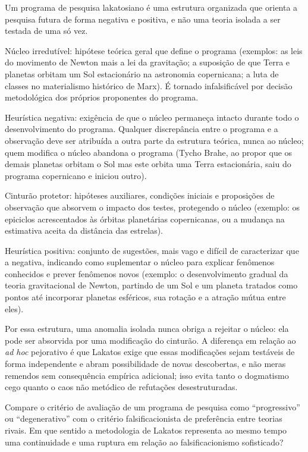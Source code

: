 \documentclass[10pt]{extarticle}
\newcommand{\resposta}[1]{\par\smallskip\noindent #1}
\begin{document}
\begin{questoes}
\resposta{
\begin{topicos}
\item Um programa de pesquisa lakatosiano é uma estrutura organizada que orienta a pesquisa futura de forma negativa e positiva, e não uma teoria isolada a ser testada de uma só vez.
\item Núcleo irredutível: hipótese teórica geral que define o programa (exemplos: as leis do movimento de Newton mais a lei da gravitação; a suposição de que Terra e planetas orbitam um Sol estacionário na astronomia copernicana; a luta de classes no materialismo histórico de Marx). É tornado infalsificável por decisão metodológica dos próprios proponentes do programa.
\item Heurística negativa: exigência de que o núcleo permaneça intacto durante todo o desenvolvimento do programa. Qualquer discrepância entre o programa e a observação deve ser atribuída a outra parte da estrutura teórica, nunca ao núcleo; quem modifica o núcleo abandona o programa (Tycho Brahe, ao propor que os demais planetas orbitam o Sol mas este orbita uma Terra estacionária, saiu do programa copernicano e iniciou outro).
\item Cinturão protetor: hipóteses auxiliares, condições iniciais e proposições de observação que absorvem o impacto dos testes, protegendo o núcleo (exemplo: os epiciclos acrescentados às órbitas planetárias copernicanas, ou a mudança na estimativa aceita da distância das estrelas).
\item Heurística positiva: conjunto de sugestões, mais vago e difícil de caracterizar que a negativa, indicando como suplementar o núcleo para explicar fenômenos conhecidos e prever fenômenos novos (exemplo: o desenvolvimento gradual da teoria gravitacional de Newton, partindo de um Sol e um planeta tratados como pontos até incorporar planetas esféricos, sua rotação e a atração mútua entre eles).
\item Por essa estrutura, uma anomalia isolada nunca obriga a rejeitar o núcleo: ela pode ser absorvida por uma modificação do cinturão. A diferença em relação ao \emph{ad hoc} pejorativo é que Lakatos exige que essas modificações sejam testáveis de forma independente e abram possibilidade de novas descobertas, e não meras remendos sem consequência empírica adicional; isso evita tanto o dogmatismo cego quanto o caos não metódico de refutações desestruturadas.
\end{topicos}
}

\item Compare o critério de avaliação de um programa de pesquisa como \enquote{progressivo} ou \enquote{degenerativo} com o critério falsificacionista de preferência entre teorias rivais. Em que sentido a metodologia de Lakatos representa ao mesmo tempo uma continuidade e uma ruptura em relação ao falsificacionismo sofisticado?


\end{questoes}
\end{document}
